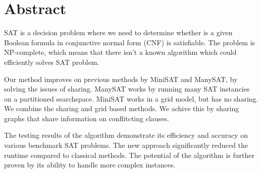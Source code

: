 \documentclass{article}
\begin{document}
\section{Abstract}
SAT is a decision problem where we need to determine whether is a given Boolean formula in conjunctive normal form (CNF) is satisfiable. The problem is NP-complete, which means that there isn’t a known algorithm which could efficiently solves SAT problem.

Our method improves on previous methods by MiniSAT and ManySAT, by solving the issues of sharing. ManySAT works by running many SAT instancies on a partitioned searchspace. MiniSAT works in a grid model, but has no sharing. We combine the sharing and grid based methods. We achive this by sharing graphs that share information on conflitcting clauses.

The testing results of the algorithm demonstrate its efficiency and accuracy on various benchmark SAT problems. The new approach significantly reduced the runtime compared to classical methods. The potential of the algorithm is further proven by its ability to handle more complex instances.
\end{document}

